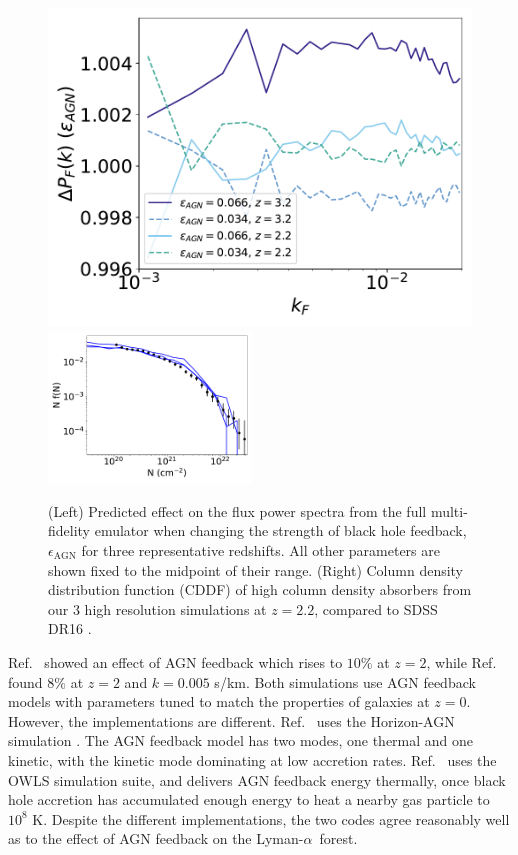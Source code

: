 \documentclass[a4paper,11pt]{article}
\newcommand{\Lya}{Lyman-$\alpha$}
\begin{document}
\begin{figure}
\centering
\includegraphics[width=0.48\columnwidth]{figures/single_param_bhfeedback.pdf}
\includegraphics[width=0.48\textwidth]{figures/cddf_hires.pdf}
 \caption{(Left) Predicted effect on the flux power spectra from the full multi-fidelity emulator when changing the strength of black hole feedback, $\epsilon_\mathrm{AGN}$ for three representative redshifts. All other parameters are shown fixed to the midpoint of their range. (Right) Column density distribution function (CDDF) of high column density absorbers from our $3$ high resolution simulations at $z=2.2$, compared to SDSS DR16 \cite{2021MNRAS.507..704H}.}
 \label{fig:DLACDDF}
\end{figure}

Ref.~\cite{Viel:2013} showed an effect of AGN feedback which rises to $10\%$ at $z=2$, while Ref.~\cite{Chabanier:2020} found $8\%$ at $z=2$ and $k = 0.005$ s/km. Both simulations use AGN feedback models with parameters tuned to match the properties of galaxies at $z=0$. However, the implementations are different. Ref.~\cite{Chabanier:2020} uses the Horizon-AGN simulation \cite{Dubois:2016}. The AGN feedback model has two modes, one thermal and one kinetic, with the kinetic mode dominating at low accretion rates. Ref.~\cite{Viel:2013} uses the OWLS simulation suite, and delivers AGN feedback energy thermally, once black hole accretion has accumulated enough energy to heat a nearby gas particle to $10^8$ K. Despite the different implementations, the two codes agree reasonably well as to the effect of AGN feedback on the \Lya~forest.
\end{document}
